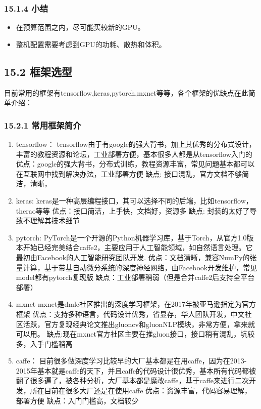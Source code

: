 \subsubsection{15.1.4 小结}\label{ux5c0fux7ed3}

\begin{itemize}
\item
  在预算范围之内，尽可能买较新的GPU。
\item
  整机配置需要考虑到GPU的功耗、散热和体积。
\end{itemize}

\subsection{15.2 框架选型}\label{ux6846ux67b6ux9009ux578b}

目前常用的框架有tensorflow,keras,pytorch,mxnet等等，各个框架的优缺点在此简单介绍：

\subsubsection{15.2.1
常用框架简介}\label{ux5e38ux7528ux6846ux67b6ux7b80ux4ecb}

\begin{enumerate}
\def\labelenumi{\arabic{enumi}.}
\item
  tensorflow：
  tensorflow由于有google的强大背书，加上其优秀的分布式设计，丰富的教程资源和论坛，工业部署方便，基本很多人都是从tensorflow入门的
  优点：google的强大背书，分布式训练，教程资源丰富，常见问题基本都可以在互联网中找到解决办法，工业部署方便
  缺点: 接口混乱，官方文档不够简洁，清晰，
\item
  keras:
  keras是一种高层编程接口，其可以选择不同的后端，比如tensorflow，therao等等
  优点：接口简洁，上手快，文档好，资源多 缺点:
  封装的太好了导致不理解其技术细节
\item
  pytorch:
  PyTorch是一个开源的Python机器学习库，基于Torch，从官方1.0版本开始已经完美结合caffe2，主要应用于人工智能领域，如自然语言处理。它最初由Facebook的人工智能研究团队开发.
  优点：文档清晰，兼容NumPy的张量计算，基于带基自动微分系统的深度神经网络，由Facebook开发维护，常见model都有pytorch复现版
  缺点：工业部署稍弱（但是合并caffe2后支持全平台部署）
\item
  mxnet
  mxnet是dmlc社区推出的深度学习框架，在2017年被亚马逊指定为官方框架
  优点：支持多种语言，代码设计优秀，省显存，华人团队开发，中文社区活跃，官方复现经典论文推出gluoncv和gluonNLP模块，非常方便，拿来就可以用。
  缺点:现在mxnet官方社区主要在推gluon接口，接口稍有混乱，坑较多，入手门槛稍高
\item
  caffe：
  目前很多做深度学习比较早的大厂基本都是在用caffe，因为在2013-2015年基本就是caffe的天下，并且caffe的代码设计很优秀，基本所有代码都被翻了很多遍了，被各种分析，大厂基本都是魔改caffe，基于caffe来进行二次开发，所在目前在很多大厂还是在使用caffe
  优点：资源丰富，代码容易理解，部署方便 缺点：入门门槛高，文档较少
\end{enumerate}

